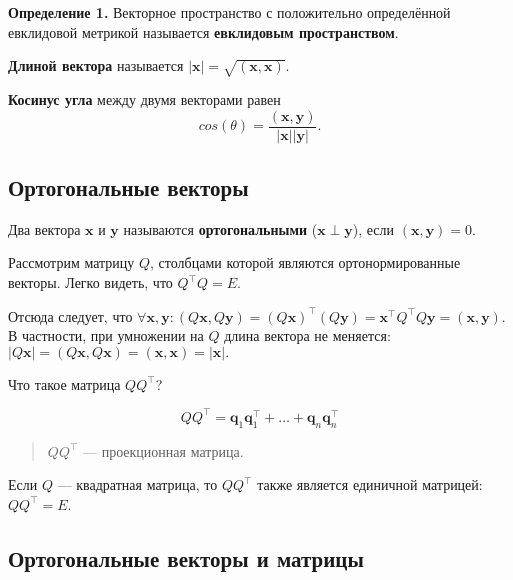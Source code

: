 \documentclass[11pt,a4paper]{article}
\begin{document}
\textbf{Определение 1.} Векторное пространство с положительно
определённой евклидовой метрикой называется \textbf{евклидовым
пространством}.

\textbf{Длиной вектора} называется
\(|\mathbf{x}| = \sqrt{(\mathbf{x}, \mathbf{x})}\).

\textbf{Косинус угла} между двумя векторами равен
\[ cos(\theta) = \frac{(\mathbf{x}, \mathbf{y})}{|\mathbf{x}| |\mathbf{y}|}. \]

    \hypertarget{ux43eux440ux442ux43eux433ux43eux43dux430ux43bux44cux43dux44bux435-ux432ux435ux43aux442ux43eux440ux44b}{%
\subsection{Ортогональные
векторы}\label{ux43eux440ux442ux43eux433ux43eux43dux430ux43bux44cux43dux44bux435-ux432ux435ux43aux442ux43eux440ux44b}}

Два вектора \(\mathbf{x}\) и \(\mathbf{y}\) называются
\textbf{ортогональными} (\(\mathbf{x} \perp \mathbf{y}\)), если
\((\mathbf{x}, \mathbf{y}) = 0\).

Рассмотрим матрицу \(Q\), столбцами которой являются ортонормированные
векторы. Легко видеть, что \(Q^\top Q = E\).

Отсюда следует, что
\(\forall \mathbf{x}, \mathbf{y}: (Q\mathbf{x}, Q\mathbf{y}) = (Q\mathbf{x})^\top (Q\mathbf{y}) = \mathbf{x}^\top Q^\top Q \mathbf{y} = (\mathbf{x}, \mathbf{y})\).
В частности, при умножении на \(Q\) длина вектора не меняется:
\(|Q\mathbf{x}| = (Q\mathbf{x}, Q\mathbf{x}) = (\mathbf{x}, \mathbf{x}) = |\mathbf{x}|.\)

Что такое матрица \(Q Q^\top\)?

\[
  Q Q^\top = \mathbf{q}_1 \mathbf{q}_1^\top + \ldots + \mathbf{q}_n \mathbf{q}_n^\top
\]

\begin{quote}
\(QQ^\top\) --- проекционная матрица.
\end{quote}

Если \(Q\) --- квадратная матрица, то \(Q Q^\top\) также является
единичной матрицей: \(Q Q^\top = E\).

    \hypertarget{ux43eux440ux442ux43eux433ux43eux43dux430ux43bux44cux43dux44bux435-ux432ux435ux43aux442ux43eux440ux44b-ux438-ux43cux430ux442ux440ux438ux446ux44b}{%
\subsection{Ортогональные векторы и
матрицы}\label{ux43eux440ux442ux43eux433ux43eux43dux430ux43bux44cux43dux44bux435-ux432ux435ux43aux442ux43eux440ux44b-ux438-ux43cux430ux442ux440ux438ux446ux44b}}
\end{document}
